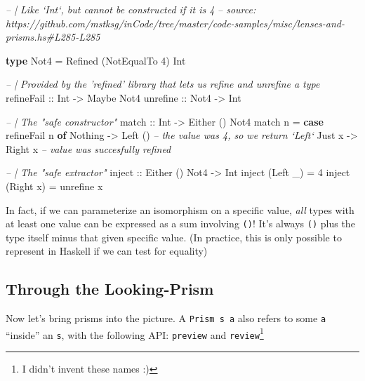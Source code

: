 \documentclass[]{article}
\newenvironment{Shaded}{}{}
\newcommand{\CommentTok}[1]{\textcolor[rgb]{0.38,0.63,0.69}{\textit{#1}}}
\newcommand{\DataTypeTok}[1]{\textcolor[rgb]{0.56,0.13,0.00}{#1}}
\newcommand{\DecValTok}[1]{\textcolor[rgb]{0.25,0.63,0.44}{#1}}
\newcommand{\FunctionTok}[1]{\textcolor[rgb]{0.02,0.16,0.49}{#1}}
\newcommand{\KeywordTok}[1]{\textcolor[rgb]{0.00,0.44,0.13}{\textbf{#1}}}
\newcommand{\NormalTok}[1]{#1}
\newcommand{\OtherTok}[1]{\textcolor[rgb]{0.00,0.44,0.13}{#1}}
\begin{document}
\begin{Shaded}
\begin{Highlighting}[]
\CommentTok{-- | Like `Int`, but cannot be constructed if it is 4}
\CommentTok{-- source: https://github.com/mstksg/inCode/tree/master/code-samples/misc/lenses-and-prisms.hs#L285-L285}

\KeywordTok{type} \DataTypeTok{Not4} \FunctionTok{=} \DataTypeTok{Refined}\NormalTok{ (}\DataTypeTok{NotEqualTo} \DecValTok{4}\NormalTok{) }\DataTypeTok{Int}

\CommentTok{-- | Provided by the 'refined' library that lets us refine and unrefine a type}
\OtherTok{refineFail ::} \DataTypeTok{Int}  \OtherTok{->} \DataTypeTok{Maybe} \DataTypeTok{Not4}
\OtherTok{unrefine   ::} \DataTypeTok{Not4} \OtherTok{->} \DataTypeTok{Int}


\CommentTok{-- | The "safe constructor"}
\OtherTok{match ::} \DataTypeTok{Int} \OtherTok{->} \DataTypeTok{Either}\NormalTok{ () }\DataTypeTok{Not4}
\NormalTok{match n }\FunctionTok{=} \KeywordTok{case}\NormalTok{ refineFail n }\KeywordTok{of}
    \DataTypeTok{Nothing} \OtherTok{->} \DataTypeTok{Left}\NormalTok{ ()          }\CommentTok{-- the value was 4, so we return `Left`}
    \DataTypeTok{Just}\NormalTok{ x  }\OtherTok{->} \DataTypeTok{Right}\NormalTok{ x          }\CommentTok{-- value was succesfully refined}

\CommentTok{-- | The "safe extractor"}
\OtherTok{inject ::} \DataTypeTok{Either}\NormalTok{ () }\DataTypeTok{Not4} \OtherTok{->} \DataTypeTok{Int}
\NormalTok{inject (}\DataTypeTok{Left}\NormalTok{  _) }\FunctionTok{=} \DecValTok{4}
\NormalTok{inject (}\DataTypeTok{Right}\NormalTok{ x) }\FunctionTok{=}\NormalTok{ unrefine x}
\end{Highlighting}
\end{Shaded}

In fact, if we can parameterize an isomorphism on a specific value, \emph{all}
types with at least one value can be expressed as a sum involving \texttt{()}!
It's always \texttt{()} plus the type itself minus that given specific value.
(In practice, this is only possible to represent in Haskell if we can test for
equality)

\hypertarget{through-the-looking-prism}{%
\subsection{Through the Looking-Prism}\label{through-the-looking-prism}}

Now let's bring prisms into the picture. A
\texttt{Prism\textquotesingle{}\ s\ a} also refers to some \texttt{a} ``inside''
an \texttt{s}, with the following API: \texttt{preview} and
\texttt{review}\footnote{I didn't invent these names :)}
\end{document}
